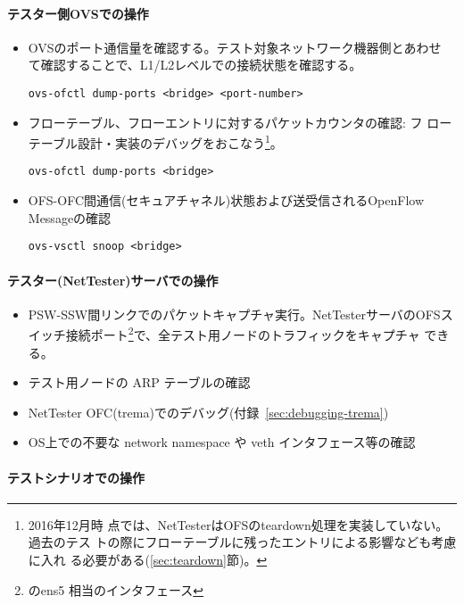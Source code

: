     \paragraph{テスター側OVSでの操作}

\begin{itemize}
 \item OVSのポート通信量を確認する。テスト対象ネットワーク機器側とあわせ
       て確認することで、L1/L2レベルでの接続状態を確認する。
\begin{lstlisting}
ovs-ofctl dump-ports <bridge> <port-number>
\end{lstlisting}
 \item フローテーブル、フローエントリに対するパケットカウンタの確認: フ
       ローテーブル設計・実装のデバッグをおこなう\footnote{2016年12月時
       点では、NetTesterはOFSのteardown処理を実装していない。過去のテス
       トの際にフローテーブルに残ったエントリによる影響なども考慮に入れ
       る必要がある(\ref{sec:teardown}節)。}。
\begin{lstlisting}
ovs-ofctl dump-ports <bridge>
\end{lstlisting}
 \item OFS-OFC間通信(セキュアチャネル)状態および送受信されるOpenFlow
       Messageの確認
\begin{lstlisting}
ovs-vsctl snoop <bridge>
\end{lstlisting}
\end{itemize}

    \paragraph{テスター(NetTester)サーバでの操作}

\begin{itemize}
 \item PSW-SSW間リンクでのパケットキャプチャ実行。NetTesterサーバのOFSス
       イッチ接続ポート\footnote{のens5
       相当のインタフェース}で、全テスト用ノードのトラフィックをキャプチャ
       できる。
 \item テスト用ノードの ARP テーブルの確認
 \item NetTester OFC(trema)でのデバッグ(付録~\ref{sec:debugging-trema})
 \item OS上での不要な network namespace や veth インタフェース等の確認
\end{itemize}

    \paragraph{テストシナリオでの操作}

